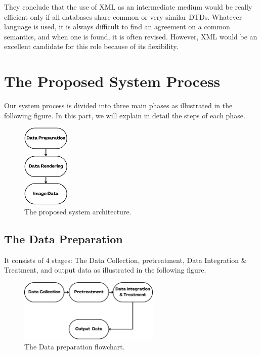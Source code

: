 
\bigbreak
They conclude that the use of XML as an intermediate medium would be really efficient only if all databases share common or very similar DTDs. Whatever language is used, it is always difficult to find an agreement on a common semantics, and when one is found, it is often revised. However, XML would be an excellent candidate for this role because of its flexibility.

\newpage

\section{The Proposed System Process}
Our system process is divided into three main phases as illustrated in the following figure. In this part, we will explain in detail the steps of each phase. 
\begin{figure}[h!]
  \center
  \includegraphics[width=0.20\textwidth]{images/chapter3/systemProcesss.png}
  \caption{The proposed system architecture.}
  \label{fig:system}
\end{figure}

\subsection{The Data Preparation}
It consists of 4 stages: The Data Collection, pretreatment, Data Integration \& Treatment, and output data as illustrated in the following figure. 
\begin{figure}[h!]
  \center
  \includegraphics[width=0.60\textwidth]{images/chapter3/system.png}
  \caption{The Data preparation flowchart.}
  \label{fig:dataprep}
\end{figure}

